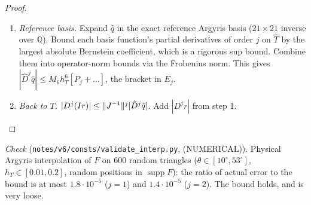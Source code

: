 \begin{proof}
\begin{enumerate}[label=\arabic*.]
\begin{itemize}
\item $|\gamma_{E_0}|\le M_6h_T^6(\tfrac2{120}+2c_H)$;
\item $|\gamma_{E_{1,2}}|\le M_6h_T^6(\tfrac{2^{-5}}{120}+\tfrac{\sqrt2}{\sin\theta}\tfrac{c_H}2)$, since the data at $a_0$ vanish.
\end{itemize}
The vertex DOFs at $a_1,a_2$ are $D^mr[E_{i_1},\dots,E_{i_m}]$, of size $\le M_6h_T^6/(6-m)!$.
\item \emph{Reference basis.} Expand $\hat q$ in the exact reference Argyris basis ($21\times21$ inverse over $\mathbb Q$).
Bound each basis function's partial derivatives of order $j$ on $\hat T$ by the largest absolute Bernstein coefficient, which
is a rigorous sup bound. Combine them into operator-norm bounds via the Frobenius norm. This gives
$|\hat D^j\hat q|\le M_6h_T^6[P_j+\dots]$, the bracket in $E_j$.
\item \emph{Back to $T$.} $|D^j(Ir)|\le\lVert J^{-1}\rVert^j|\hat D^j\hat q|$. Add $|D^jr|$ from step 1.\qedhere
\end{enumerate}
\end{proof}
\emph{Check} (\texttt{notes/v6/consts/validate\_interp.py}, (NUMERICAL)). Physical Argyris interpolation of $F$ on 600 random triangles
($\theta\in[10^\circ,53^\circ]$, $h_T\in[0.01,0.2]$, random positions in $\operatorname{supp}F$): the ratio of actual error to
the bound is at most $1.8\cdot10^{-5}$ ($j=1$) and $1.4\cdot10^{-5}$ ($j=2$). The bound holds, and is very loose.


